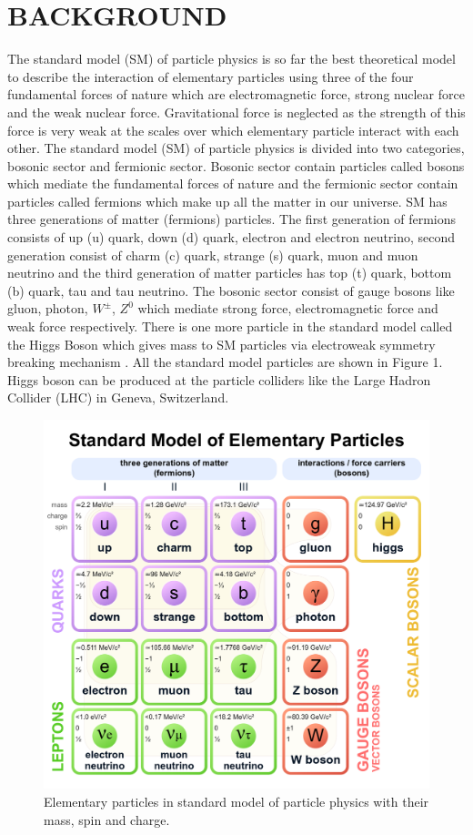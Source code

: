 \documentclass[final,3p]{CSP}
\begin{document}
\hspace{0pt}
\vfill



\newpage
\section{BACKGROUND}


The standard model (SM) of particle physics is so far the best theoretical model to describe the interaction of elementary 
particles using three of the four fundamental forces of nature which are electromagnetic force, strong nuclear force and the 
weak nuclear force. Gravitational force is neglected as the strength of this force is very weak at the scales over which 
elementary particle interact with each other. The standard model (SM) of particle physics is divided into two categories, 
bosonic sector and fermionic sector. Bosonic sector contain particles called bosons which mediate the fundamental forces of 
nature and the fermionic sector contain particles called fermions which make up all the matter in our universe. SM has three 
generations of matter (fermions) particles. The first generation of fermions consists of up (u) quark, down (d) quark, electron 
and electron neutrino, second generation consist of charm (c) quark, strange (s) quark, muon and muon neutrino and the third 
generation of matter particles has top (t) quark, bottom (b) quark, tau and tau neutrino. The bosonic sector consist of gauge 
bosons like gluon, photon, $W^{\pm}$, $Z^0$ which mediate strong force, electromagnetic force and weak force respectively. There is one more particle in the standard model called the Higgs Boson which gives mass to SM particles via electroweak symmetry breaking mechanism \cite{Chatrchyan:2012xdj}. All the standard model particles are shown in Figure 1. Higgs boson can be produced at the particle colliders like the Large Hadron Collider (LHC) in Geneva, Switzerland.

\begin{figure}[H]
	\centering
	\includegraphics[width= 0.5 \columnwidth]{./sm.png}
	\caption{Elementary particles in standard model of particle physics with their mass, spin and charge.}
	\label{figure 1}
\end{figure}
\end{document}
